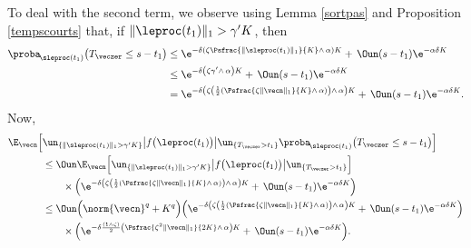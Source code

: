 To deal with the second term, we observe using Lemma \ref{sortpas} and Proposition \ref{tempscourts} that,
if $\|\leproc(t_{1})\|_1> \gamma' K$, then
\begin{align*}
\proba_{\!\sleproc(t_{1})}\bigl(T_{\veczer}\le s-t_{1}\bigr)
& \le \e^{-\delta\left(\zeta\Psfrac{\|\sleproc(t_{1})\|_{1}}{K}\wedge\,\alpha\right)K}+\,\Oun (s-t_{1})\e^{-\alpha\delta K}\\
& \leq \e^{-\delta\left(\zeta\gamma'\wedge\,\alpha\right)K}+\,\Oun (s-t_{1})\e^{-\alpha\delta K}\\
& =\e^{-\delta\left(\zeta\left(\frac{1}{2} \left(\Psfrac{\zeta \|\vecn\|_{1}}{K} \wedge\, \alpha \right)\right)\wedge\,\alpha\right)K}+\,\Oun (s-t_{1})\e^{-\alpha\delta K}.
\end{align*}
Now,
\begin{align*}
\E_{\vecn}\Bigl[&\un_{\{\|\sleproc(t_{1})\|_1> \gamma' K\}}
\big|f\bigl(\leproc(t_{1})\bigr)\big|\un_{\{T_{\veczer}>t_{1}\}}
\proba_{\!\sleproc(t_{1})}\bigl(T_{\veczer}\le s-t_{1}\bigr)\Bigr]\\
& \leq \Oun \E_{\vecn}\Bigl[\un_{\{\|\sleproc(t_{1})\|_1> \gamma' K\}}
\big|f\bigl(\leproc(t_{1})\bigr)\big|\un_{\{T_{\veczer}>t_{1}\}}
\Bigr]\\
& \qquad\times \Bigl(\e^{-\delta\left(\zeta\left(\frac{1}{2} \left(\Psfrac{\zeta \|\vecn\|_{1}}{K} \wedge\, \alpha\right)\right)
\wedge\,\alpha\right)K}+\,\Oun (s-t_{1})\e^{-\alpha\delta K}\Bigr)\\
& \leq \Oun \Bigl(\norm{\vecn}^{q}+K^{q}\Bigr) \Bigl(\e^{-\delta\left(\zeta\left(\frac{1}{2} \left(\Psfrac{\zeta \|\vecn\|_{1}}{K}
\wedge\, \alpha\right)\right)\wedge\,\alpha\right)K}+\,\Oun (s-t_{1})\e^{-\alpha\delta K}\Bigr)\\
&
\qquad \times \Bigl(\e^{-\delta \frac{(1\wedge \zeta)}{2} \left(\Psfrac{\zeta^2 \|\vecn\|_{1}}{2K} \wedge\, \alpha\right)K}+\,
\Oun (s-t_{1})\e^{-\alpha\delta K}\Bigr).
\end{align*}

